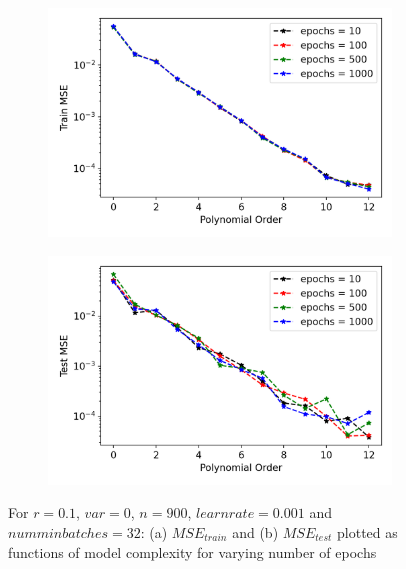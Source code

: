 \begin{figure}
\centering
\begin{subfigure}{.5\textwidth}
  \centering
  \includegraphics[width=.9\linewidth]{Images/olssgd6.png}
  \caption{}
  \label{fig:olssgd6}
\end{subfigure}%
\begin{subfigure}{.5\textwidth}
  \centering
  \includegraphics[width=.9\linewidth]{Images/olssgd5.png}
  \caption{}
  \label{fig:olssgd5}
\end{subfigure}
\caption{For $r=0.1$, $var=0$, $n=900$, $learn rate = 0.001$ and $num min batches=32$: (a) $MSE_{train}$ and (b) $MSE_{test}$ plotted as functions of model complexity for varying number of epochs}
\label{fig:ols sgd epochs}
\end{figure}